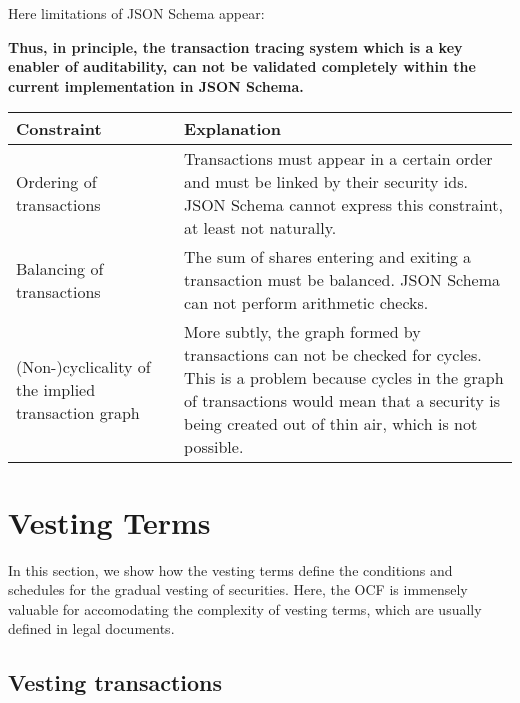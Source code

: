 
Here limitations of JSON Schema appear: 
  

\textbf{Thus, in principle, the transaction tracing system which is a key enabler of auditability, can not be validated completely within the current implementation in JSON Schema.}

\begin{tabular}{|p{5cm}|p{8cm}|}
\hline
\textbf{Constraint}                                & \textbf{Explanation}                                                                                                                                                                                                           \\
\hline
Ordering of transactions                           & Transactions must appear in a certain order and must be linked by their security ids. JSON Schema cannot express this constraint, at least not naturally\footnotemark.                                                         \\
\hline
Balancing of transactions                          & The sum of shares entering and exiting a transaction must be balanced. JSON Schema can not perform arithmetic checks.                                                                                                          \\
\hline
(Non-)cyclicality of the implied transaction graph & More subtly, the graph formed by transactions can not be checked for cycles. This is a problem because cycles in the graph of transactions would mean that a security is being created out of thin air, which is not possible. \\
\hline
\end{tabular}

\section{Vesting Terms}

In this section, we show how the vesting terms define the conditions and schedules for the gradual vesting of securities. Here, the OCF is immensely valuable for accomodating the complexity of vesting terms, which are usually defined in legal documents.

\subsection{Vesting transactions}

